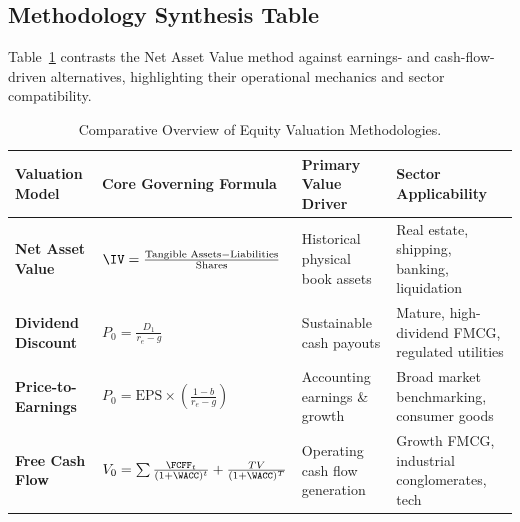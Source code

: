 \subsection{Methodology Synthesis Table}
Table~\ref{tab:model_comparison} contrasts the Net Asset Value method against earnings- and cash-flow-driven alternatives, highlighting their operational mechanics and sector compatibility.

\begin{table}[H]
\centering
\small
\renewcommand{\arraystretch}{1.25}
\begin{tabularx}{\textwidth}{l p{4.3cm} p{3.1cm} X}
\toprule
\textbf{Valuation Model} & \textbf{Core Governing Formula} & \textbf{Primary Value Driver} & \textbf{Sector Applicability} \\
\midrule
\textbf{Net Asset Value} & $\IV = \frac{\text{Tangible Assets} - \text{Liabilities}}{\text{Shares}}$ & Historical physical book assets & Real estate, shipping, banking, liquidation \\
\textbf{Dividend Discount} & $P_0 = \frac{D_1}{r_e - g}$ & Sustainable cash payouts & Mature, high-dividend FMCG, regulated utilities \\
\textbf{Price-to-Earnings} & $P_0 = \text{EPS} \times \left(\frac{1 - b}{r_e - g}\right)$ & Accounting earnings \& growth & Broad market benchmarking, consumer goods \\
\textbf{Free Cash Flow} & $V_0 = \sum \frac{\FCFF_t}{(1 + \WACC)^t} + \frac{TV}{(1+\WACC)^T}$ & Operating cash flow generation & Growth FMCG, industrial conglomerates, tech \\
\bottomrule
\end{tabularx}
\caption{Comparative Overview of Equity Valuation Methodologies.}
\label{tab:model_comparison}
\end{table}
